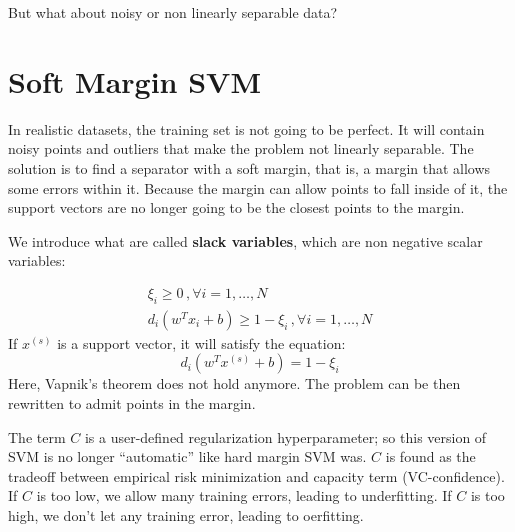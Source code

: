 But what about noisy or non linearly separable data?

\section{Soft Margin SVM}

In realistic datasets, the training set is not going to be perfect. It will contain noisy points and outliers that make the problem not linearly separable. The solution is to find a separator with a soft margin, that is, a margin that allows some errors within it. Because the margin can allow points to fall inside of it, the support vectors are no longer going to be the closest points to the margin.

We introduce what are called \textbf{slack variables}, which are non negative scalar variables:

\begin{gather*}
    \xi_i \geq 0 \, , \forall i = 1, \dots , N \\
    d_i(w^T x_i + b) \geq 1 - \xi_i \, , \forall i = 1, \dots , N
\end{gather*}
If $x^{(s)}$ is a support vector, it will satisfy the equation:
\begin{equation*}
    d_i(w^T x^{(s)} + b) = 1 - \xi_i 
\end{equation*}
Here, Vapnik's theorem does not hold anymore. The problem can be then rewritten to admit points in the margin.

The term $C$ is a user-defined regularization hyperparameter; so this version of SVM is no longer ``automatic'' like hard margin SVM was. $C$ is found as the tradeoff between empirical risk minimization and capacity term (VC-confidence). If $C$ is too low, we allow many training errors, leading to underfitting. If $C$ is too high, we don't let any training error, leading to oerfitting.

